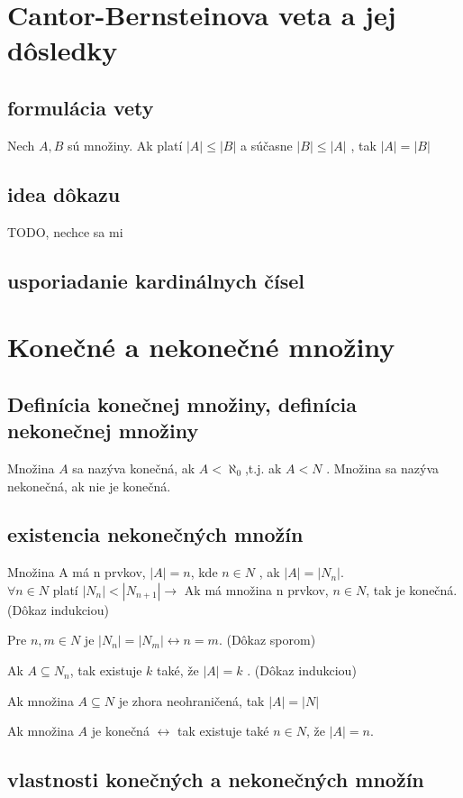 \section {Cantor-Bernsteinova veta a jej dôsledky}
 	\subsection*{formulácia vety}
 		Nech $A, B$ sú množiny. Ak platí $|A| \leq |B|$ a súčasne $|B| \leq |A|$ , tak $|A| = |B|$
 	\subsection*{idea dôkazu}
 		TODO, nechce sa mi
 	\subsection*{usporiadanie kardinálnych čísel}

\section {Konečné a nekonečné množiny}
	\subsection*{Definícia konečnej množiny, definícia nekonečnej množiny}
		Množina $A$ sa nazýva konečná, ak $A < \aleph_{0}$,t.j. ak $A < N$ . Množina sa nazýva nekonečná, ak nie je konečná.

  	\subsection*{existencia nekonečných množín} 
		Množina A má n prvkov, $|A| = n$, kde $n \in N$ , ak $|A| = |N_{n}|$.\\
		$ \forall n \in N$ platí $|N_{n}| < |N_{n+1}| \rightarrow $ Ak má množina n prvkov, $n \in N$, tak je konečná.
		(Dôkaz indukciou)

		Pre $n,m \in N$ je $|N_{n}| = |N_{m}|  \leftrightarrow n = m$.
		(Dôkaz sporom)

		Ak $A \subseteq N_{n}$, tak existuje $k$ také, že $|A| = k$ .
		(Dôkaz indukciou)

		Ak množina $A \subseteq N$ je zhora neohraničená, tak $|A| = |N|$

		Ak množina $A$ je konečná $\leftrightarrow$ tak existuje také $n \in N$, že $|A| = n$.

  	\subsection*{vlastnosti konečných a nekonečných množín}

